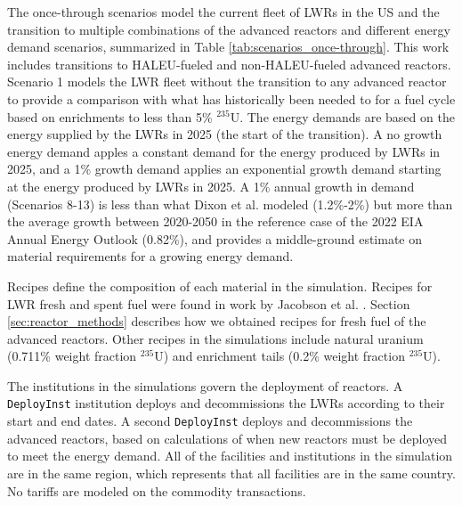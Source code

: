 

The once-through scenarios model the current fleet of \glspl{LWR} in the 
US and the transition to multiple 
combinations of the advanced reactors and different energy demand scenarios, 
summarized in Table \ref{tab:scenarios_once-through}. This work includes 
transitions to \gls{HALEU}-fueled and non-\gls{HALEU}-fueled advanced 
reactors. Scenario 1 models
the \gls{LWR} fleet without the transition to any advanced reactor to provide 
a comparison with what has historically been needed to for a fuel cycle 
based on enrichments to less than 5\% $^{235}$U. The energy demands are 
based on the energy supplied by the \glspl{LWR} in 2025 (the start of 
the transition). A no growth energy demand apples a constant demand for 
the energy produced by \glspl{LWR} in 2025, and a 1\% growth demand applies 
an exponential growth demand starting at the energy produced by \glspl{LWR}
in 2025. A 1\% annual growth in 
demand (Scenarios 8-13) is less than what Dixon et al. \cite{dixon_estimated_2022} 
modeled
(1.2\%-2\%) but more than the average growth between 2020-2050 in the 
reference case of the 2022 \gls{EIA} Annual Energy Outlook 
\cite{energy_information_administration_annual_2022} (0.82\%), and 
provides a middle-ground estimate on material requirements for a growing 
energy demand. 

Recipes define the composition of each material in the simulation. 
Recipes for \gls{LWR} fresh and spent fuel were found in work 
by Jacobson et al. \cite{jacobson_verifiable_2010}.
Section \ref{sec:reactor_methods} describes how we obtained recipes for fresh 
fuel of the advanced reactors. Other recipes in the simulations include 
natural uranium (0.711\% weight fraction $^{235}$U) and enrichment tails 
(0.2\% weight fraction $^{235}$U).

The institutions in the simulations 
govern the deployment of reactors. A \Cycamore \texttt{DeployInst} 
institution \cite{huff_fundamental_2016} deploys and decommissions the 
\glspl{LWR} according to their start and end dates. A second \Cycamore 
\texttt{DeployInst} deploys and decommissions the advanced reactors, based 
on calculations of when new reactors must be deployed to meet the energy 
demand. All of the facilities and institutions in the simulation are in 
the same region, which represents that all facilities are in the same 
country. No  
tariffs are modeled on the commodity transactions.


